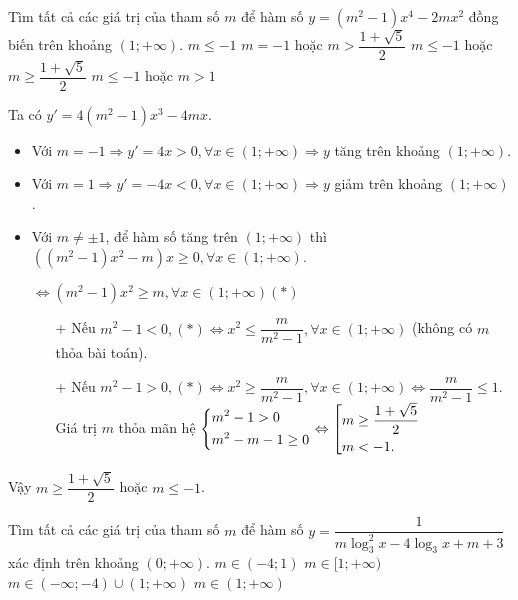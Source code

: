 \begin{ex}%
	Tìm tất cả các giá trị của tham số $m$ để hàm số $y=\left(m^2-1\right)x^4-2mx^2$ đồng biến trên khoảng $(1;+\infty)$.
	\choice
	{$m\le-1$}
	{$m=-1$ hoặc $m>\dfrac{1+\sqrt{5}}{2}$}
	{\True $m\le-1$ hoặc $m\ge\dfrac{1+\sqrt{5}}{2}$}
	{$m\le-1$ hoặc $m>1$}
	\loigiai
	{
		Ta có $y'=4(m^2-1)x^3-4mx$.
		\begin{itemize}
			\item Với $m=-1 \Rightarrow y'=4x>0, \forall x \in (1;+\infty) \Rightarrow y$ tăng trên khoảng $(1;+\infty)$.
			\item Với $m=1 \Rightarrow y'=-4x<0, \forall x \in (1;+\infty) \Rightarrow y$ giảm trên khoảng $(1;+\infty)$.
			\item  Với $m \ne \pm 1$, để hàm số tăng trên $(1;+\infty)$ thì $\left((m^2-1)x^2-m\right)x \ge 0, \forall x \in (1;+\infty)$.
			\begin{center}
				$\Leftrightarrow (m^2-1)x^2 \ge m , \forall x \in (1;+\infty) (*)$
			\end{center}
			\vspace{-3ex}
			\begin{itemize}
				\item[+] Nếu $m^2-1<0, (*) \Leftrightarrow x^2\le \dfrac{m}{m^2-1} , \forall x \in (1;+\infty)$ (không có $m$ thỏa bài toán). 
				\item[+] Nếu $m^2-1>0, (*) \Leftrightarrow x^2 \ge \dfrac{m}{m^2-1} , \forall x \in (1;+\infty) \Leftrightarrow \dfrac{m}{m^2-1} \le 1$. \\Giá trị $m$ thỏa mãn hệ $\left\{\begin{aligned}&m^2-1>0\\&m^2-m-1\ge0\end{aligned}\right. \Leftrightarrow \left[\begin{aligned}&m\ge\dfrac{1+\sqrt{5}}{2}\\&m<-1.\end{aligned}\right.$
			\end{itemize}
		\end{itemize}
		Vậy $m\ge\dfrac{1+\sqrt{5}}{2}$ hoặc $m\le-1$.
	}
\end{ex}

\begin{ex}%
	Tìm tất cả các giá trị của tham số $m$ để hàm số $y= \dfrac{1}{m \log_3^2x-4 \log_3x+m+3}$ xác định trên khoảng $(0;+ \infty)$.
	\choice
	{$m \in (-4;1)$}
	{$m \in [1;+ \infty)$}
	{\True $m \in (- \infty;-4) \cup (1;+ \infty)$}
	{$m \in (1; + \infty)$}
\end{ex}

